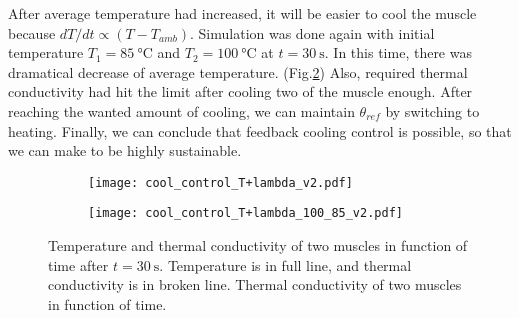 After average temperature had increased, it will be easier to cool the muscle because $dT/dt \propto (T-T_{amb})$. Simulation was done again with initial temperature $T_{1}=\SI{85}{\degreeCelsius}$ and $T_{2}=\SI{100}{\degreeCelsius}$ at $t=\SI{30}{\second}$. In this time, there was dramatical decrease of average temperature. (Fig.\ref{cool_control_100}) Also, required thermal conductivity had hit the limit after cooling two of the muscle enough. After reaching the wanted amount of cooling, we can maintain $\theta_{ref}$ by switching to heating. Finally, we can conclude that feedback cooling control is possible, so that we can make \apc to be highly sustainable.

\begin{figure}[t]
	\centering
	\begin{subfigure}[t]{0.45\textwidth}
		\centering\texttt{[image: cool\_control\_T+lambda\_v2.pdf]}
		\caption{\label{cool_control}}
	\end{subfigure}%
	\begin{subfigure}[t]{0.45\textwidth}
		\centering\texttt{[image: cool\_control\_T+lambda\_100\_85\_v2.pdf]}
		\caption{\label{cool_control_100}}
	\end{subfigure}
	\caption[Sustainable closed-loop \apc simulation]{ Temperature and thermal conductivity of two muscles in function of time after $t=\SI{30}{\second}$. Temperature is in full line, and thermal conductivity is in broken line.  Thermal conductivity of two muscles in function of time. }
	\label{cool_simulation}
\end{figure}




